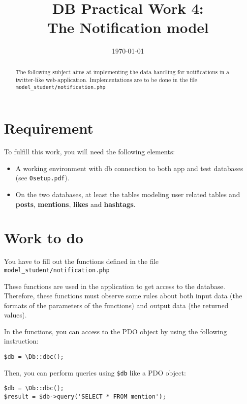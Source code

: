 \documentclass[twoside,a4paper,12pt]{article}
\title{DB Practical Work 4:\\The Notification model}
\date{\today}
\begin{document}
\maketitle

\begin{abstract}
  The following subject aims at implementing the data handling for notifications in a twitter-like web-application. Implementations are to be done in the file \texttt{model\_student/notification.php}
\end{abstract}

\tableofcontents

\clearpage

\section{Requirement}
To fulfill this work, you will need the following elements:

\begin{itemize}
\item A working environment with db connection to both app and test databases (see \texttt{0setup.pdf}).
\item On the two databases, at least the tables modeling user related tables and \textbf{posts}, \textbf{mentions}, \textbf{likes} and \textbf{hashtags}.
\end{itemize}

\section{Work to do}
You have to fill out the functions defined in the file \texttt{model\_student/notification.php}

These functions are used in the application to get access to the database. Therefore, these functions must observe some rules about both input data (the formats of the parameters of the functions) and output data (the returned values).

In the functions, you can access to the PDO object by using the following instruction:

\begin{lstlisting}
$db = \Db::dbc();
\end{lstlisting}

Then, you can perform queries using \texttt{\$db} like a PDO object:
\begin{lstlisting}
$db = \Db::dbc();
$result = $db->query('SELECT * FROM mention');
\end{lstlisting}
\end{document}
